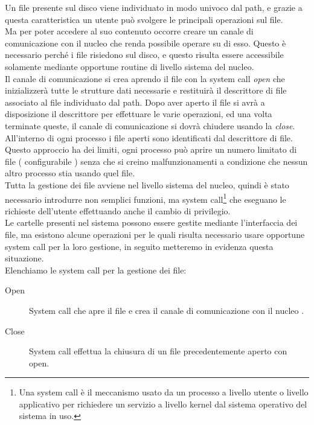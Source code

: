  Un file presente sul disco viene individuato in modo univoco dal path, e grazie a questa caratteristica un utente può svolgere le principali operazioni sul file.\\
 Ma per poter accedere al suo contenuto occorre creare un canale di comunicazione con il nucleo che renda possibile operare su di esso. 
 Questo è necessario perché i file risiedono sul disco, e questo risulta essere accessibile solamente mediante opportune routine di livello sistema del nucleo.\\
 Il canale di comunicazione si crea aprendo il file con la system call \textit{open} che inizializzerà tutte le strutture dati necessarie e restituirà il descrittore di file associato al file individuato dal path.
 Dopo aver aperto il file si avrà a disposizione il descrittore per effettuare le varie operazioni, ed una volta terminate queste, il canale di comunicazione si dovrà chiudere usando la \textit{close}. 
 All'interno di ogni processo i file aperti sono identificati dal descrittore di file. Questo approccio ha dei limiti, ogni processo può aprire un numero limitato di file ( configurabile ) senza che si creino malfunzionamenti a condizione che  nessun altro processo stia usando quel file. \\
 Tutta la gestione dei file avviene nel livello sistema del nucleo, quindi è stato necessario introdurre non semplici funzioni, ma system call\footnote { Una system call è il meccanismo usato da un processo a livello utente o livello applicativo per richiedere un servizio a livello kernel dal sistema operativo del sistema in uso.}
    che eseguano le richieste dell'utente effettuando anche il cambio di privilegio.\\
 Le cartelle presenti nel sistema possono essere gestite mediante l'interfaccia dei file, ma esistono alcune operazioni per le quali risulta necessario usare opportune system call per la loro gestione, in seguito metteremo in evidenza questa situazione. \\	
 Elenchiamo le system call per la gestione dei file: \\

    
     
     \begin{description}
      \item[Open]
	System call che apre il file e crea il canale di comunicazione con il nucleo .
     \end{description}
      
      \begin{description}
       \item[Close]
	System call effettua la chiusura di un file precedentemente aperto con open.
       \end{description}
       
